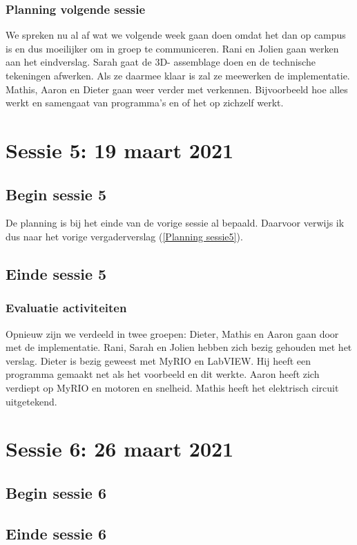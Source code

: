 \documentclass[a4paper,twoside,kulak]{kulakreport} %
\begin{document}
\subsection{Planning volgende sessie}
We spreken nu al af wat we volgende week gaan doen omdat het dan op campus is en dus moeilijker om in groep te communiceren. Rani en Jolien gaan werken aan het eindverslag. Sarah gaat de 3D- assemblage doen en de technische tekeningen afwerken. Als ze daarmee klaar is zal ze meewerken de implementatie. Mathis, Aaron en Dieter gaan weer verder met verkennen. Bijvoorbeeld hoe alles werkt en samengaat van programma's en of het op zichzelf werkt. %
\label{Planning sessie5}

\chapter{Sessie 5: 19 maart 2021}
\section{Begin sessie 5}
De planning is bij het einde van de vorige sessie al bepaald. Daarvoor verwijs ik dus naar het vorige vergaderverslag (\ref{Planning sessie5}).

\section{Einde sessie 5}
\subsection{Evaluatie activiteiten}
Opnieuw zijn we verdeeld in twee groepen: Dieter, Mathis en Aaron gaan door met de implementatie. Rani, Sarah en Jolien hebben zich bezig gehouden met het verslag. Dieter is bezig geweest met MyRIO en LabVIEW. Hij heeft een programma gemaakt net als het voorbeeld en dit werkte. Aaron heeft zich verdiept op MyRIO en motoren en snelheid. Mathis heeft het elektrisch circuit uitgetekend. 

\chapter{Sessie 6: 26 maart 2021}
\section{Begin sessie 6}

\section{Einde sessie 6}
\end{document}
